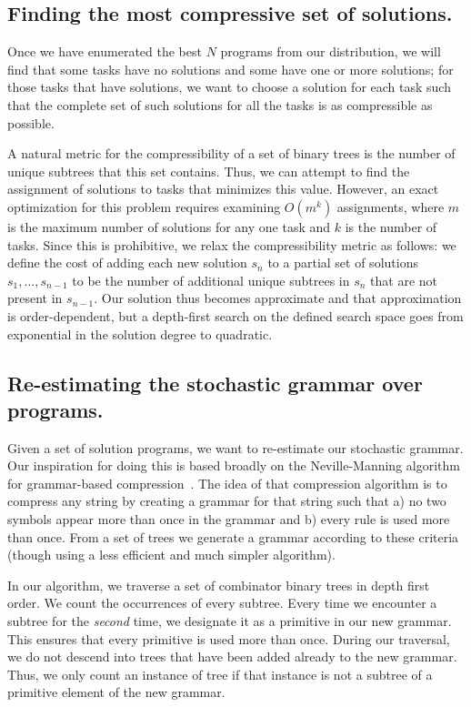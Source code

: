 \documentclass{article}
\begin{document}
\subsection{Finding the most compressive set of solutions.}

Once we have enumerated the best $N$ programs from our distribution,
we will find that some tasks have no solutions and some have one or
more solutions; for those tasks that have solutions, we want to choose
a solution for each task such that the complete set of such solutions
for all the tasks is as compressible as possible.

A natural metric for the compressibility of a set of binary trees is
the number of unique subtrees that this set contains. Thus, we can
attempt to find the assignment of solutions to tasks that minimizes
this value. However, an exact optimization for this problem requires
examining $O(m^k)$ assignments, where $m$ is the maximum number of
solutions for any one task and $k$ is the number of tasks. Since this
is prohibitive, we relax the compressibility metric as follows: we
define the cost of adding each new solution $s_n$ to a partial set of
solutions $s_1, \dots, s_{n-1}$ to be the number of additional unique
subtrees in $s_n$ that are not present in $s_{n-1}$. Our solution thus
becomes approximate and that approximation is order-dependent, but a
depth-first search on the defined search space goes from exponential
in the solution degree to quadratic.

\subsection{Re-estimating the stochastic grammar over programs.}

Given a set of solution programs, we want to re-estimate our
stochastic grammar. Our inspiration for doing this is based broadly on
the Neville-Manning algorithm for grammar-based
compression~\cite{nevill1997identifying}. The idea of that compression
algorithm is to compress any string by creating a grammar for that
string such that a) no two symbols appear more than once in the
grammar and b) every rule is used more than once. From a set of trees
we generate a grammar according to these criteria (though using a less
efficient and much simpler algorithm). 

In our algorithm, we traverse a set of combinator binary trees in
depth first order. We count the occurrences of every subtree. Every
time we encounter a subtree for the \emph{second} time, we designate
it as a primitive in our new grammar. This ensures that every
primitive is used more than once. During our traversal, we do not
descend into trees that have been added already to the new
grammar. Thus, we only count an instance of tree if that instance is
not a subtree of a primitive element of the new grammar.
\end{document}
